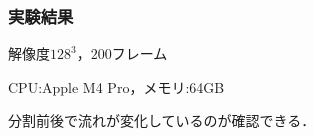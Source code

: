 \documentclass[aspectratio=169,dvipdfmx,hyperref={bookmarks=true}]{beamer}
\begin{document}
 \begin{frame}
 \frametitle{実験結果}
\begin{block}{}
解像度$128^3$，$200$フレーム

CPU:Apple M4 Pro，メモリ:64GB

分割前後で流れが変化しているのが確認できる．
\end{block}



\end{frame}
  
\end{document}
